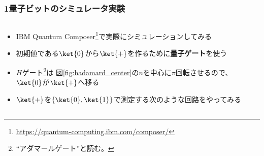 \begin{frame}
  \frametitle{1量子ビットのシミュレータ実験}

  \pause
  \begin{columns}
    \begin{column}{0.6\textwidth}
      \begin{itemize}
        \item<+-> IBM Quantum Composer\footnote{\url{https://quantum-computing.ibm.com/composer/}}で実際にシミュレーションしてみる

        \item<+-> 初期値である$\ket{0}$から$\ket{+}$を作るために\textbf{量子ゲート}を使う

        \item<+-> $H$ゲート\footnote{``アダマールゲート''と読む。}は
        図\ref{fig:hadamard_center}の$n$を中心に$\pi$回転させるので、
        $\ket{0}$が$\ket{+}$へ移る

        \item<+-> $\ket{+}$を$\left\{\ket{0}, \ket{1}\right\}$で測定する次のような回路をやってみる
        \begin{figure}
          \centering
        \end{figure}
      \end{itemize}
    \end{column}
    \begin{column}{0.4\textwidth}
    \end{column}
  \end{columns}
\end{frame}

